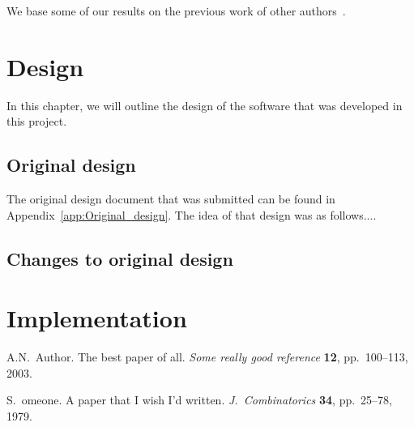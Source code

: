 \documentclass[twocolumn,11pt]{report}
\begin{document}
We base some of our results on the previous work of other authors~\cite{A1, Someone}.



\chapter{Design}\label{chap:design}

In this chapter, we will outline the design of the software that was
developed in this project.  

\section{Original design}\label{chap:first_design}
The original design document that was submitted can be found in 
Appendix~\ref{app:Original_design}.  The idea of that design
was as follows....


\section{Changes to original design}



\chapter{Implementation}\label{chap:implementation}








\begin{thebibliography}{99}

A.N.~Author.  The best paper of all.
{\em Some really good reference} {\bf 12}, pp.~100--113, 2003.

S.~omeone.  A paper that I wish I'd written.  
{\em J.\ Combinatorics} {\bf 34}, pp.~25--78, 1979.  

\end{thebibliography}
\end{document}
